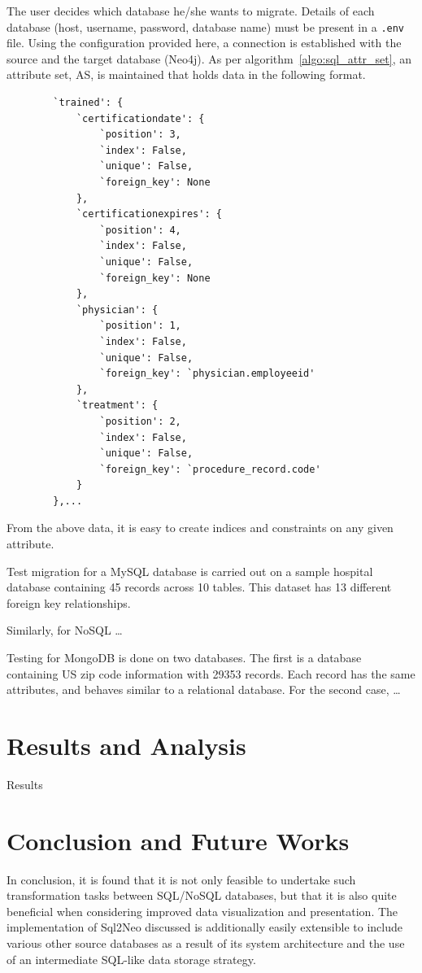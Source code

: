 \documentclass[12pt]{article}
\newcommand{\sectionfontstyle}{\fontsize{16pt}{1em}\usefont{T1}{phv}{b}{n}}
\begin{document}
    The user decides which database he/she wants to migrate. Details of each database (host, username, password, database name) must be present in a \verb|.env| file. Using the configuration provided here, a connection is established with the source and the target database (Neo4j). As per algorithm~\ref{algo:sql_attr_set}, an attribute set, AS, is maintained that holds data in the following format.
    \begin{lstlisting}
        `trained': {
            `certificationdate': {
                `position': 3, 
                `index': False, 
                `unique': False, 
                `foreign_key': None
            },
            `certificationexpires': {
                `position': 4, 
                `index': False, 
                `unique': False, 
                `foreign_key': None
            },
            `physician': {
                `position': 1, 
                `index': False, 
                `unique': False, 
                `foreign_key': `physician.employeeid'
            },
            `treatment': {
                `position': 2, 
                `index': False, 
                `unique': False, 
                `foreign_key': `procedure_record.code'
            }
        },...
    \end{lstlisting}

    From the above data, it is easy to create indices and constraints on any given attribute.

    Test migration for a MySQL database is carried out on a sample hospital database containing 45 records across 10 tables. This dataset has 13 different foreign key relationships.

    Similarly, for NoSQL \dots

    Testing for MongoDB is done on two databases. The first is a database containing US zip code information with 29353 records. Each record has the same attributes, and behaves similar to a relational database. For the second case, \dots

    \newpage

    \section{\sectionfontstyle Results and Analysis}
    Results

    \newpage

    \section{\sectionfontstyle Conclusion and Future Works}
    In conclusion, it is found that it is not only feasible to undertake such transformation tasks between SQL/NoSQL databases, but that it is also quite beneficial when considering improved data visualization and presentation. The implementation of Sql2Neo discussed is additionally easily extensible to include various other source databases as a result of its system architecture and the use of an intermediate SQL-like data storage strategy. 
\end{document}
